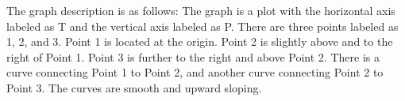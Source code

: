 The graph description is as follows: The graph is a plot with the horizontal axis labeled as T and the vertical axis labeled as P. There are three points labeled as 1, 2, and 3. Point 1 is located at the origin. Point 2 is slightly above and to the right of Point 1. Point 3 is further to the right and above Point 2. There is a curve connecting Point 1 to Point 2, and another curve connecting Point 2 to Point 3. The curves are smooth and upward sloping.